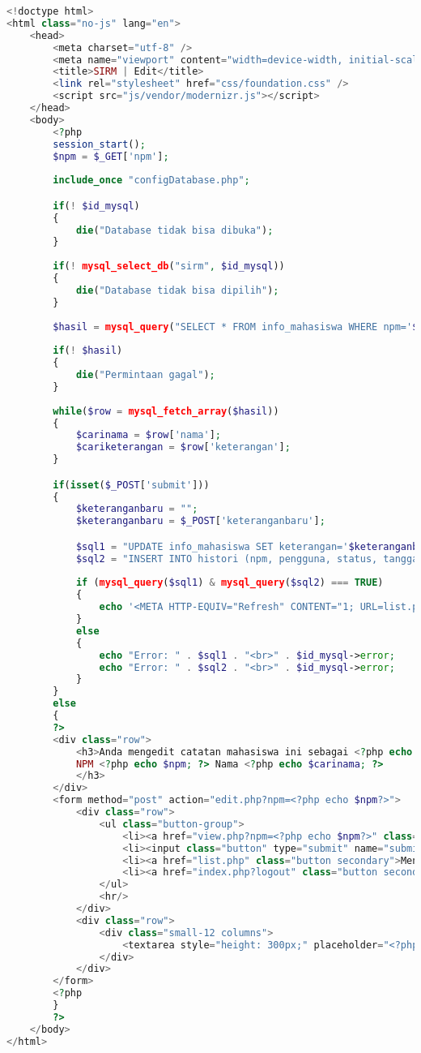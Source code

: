 \begin{lstlisting}[language=php,basicstyle=\tiny,caption=edit.php]
<!doctype html>
<html class="no-js" lang="en">
	<head>
		<meta charset="utf-8" />
		<meta name="viewport" content="width=device-width, initial-scale=1.0" />
		<title>SIRM | Edit</title>
		<link rel="stylesheet" href="css/foundation.css" />
		<script src="js/vendor/modernizr.js"></script>
	</head>
	<body>
		<?php
		session_start();
		$npm = $_GET['npm'];
		
		include_once "configDatabase.php";

		if(! $id_mysql)
		{
			die("Database tidak bisa dibuka");
		}
			
		if(! mysql_select_db("sirm", $id_mysql))
		{
			die("Database tidak bisa dipilih");
		}
			
		$hasil = mysql_query("SELECT * FROM info_mahasiswa WHERE npm='$npm'", $id_mysql);
		
		if(! $hasil)
		{
			die("Permintaan gagal");
		}
		
		while($row = mysql_fetch_array($hasil))
		{
			$carinama = $row['nama'];
			$cariketerangan = $row['keterangan'];
		}

		if(isset($_POST['submit']))
		{
			$keteranganbaru = "";
			$keteranganbaru = $_POST['keteranganbaru'];

			$sql1 = "UPDATE info_mahasiswa SET keterangan='$keteranganbaru', pembaruan_terakhir=now() WHERE npm='$npm'";
			$sql2 = "INSERT INTO histori (npm, pengguna, status, tanggal_pembaruan, keterangan) VALUES ('". mysql_real_escape_string($npm)  ."', '".$_SESSION['email']."', 'mengedit', now(), '". mysql_real_escape_string($keteranganbaru)  ."')";
			
			if (mysql_query($sql1) & mysql_query($sql2) === TRUE) 
			{
				echo '<META HTTP-EQUIV="Refresh" CONTENT="1; URL=list.php">';
			} 
			else
			{
				echo "Error: " . $sql1 . "<br>" . $id_mysql->error;
				echo "Error: " . $sql2 . "<br>" . $id_mysql->error;
			}
		}
		else
		{
		?>
		<div class="row">
			<h3>Anda mengedit catatan mahasiswa ini sebagai <?php echo $_SESSION['email']?>.<br/>
			NPM <?php echo $npm; ?> Nama <?php echo $carinama; ?>
			</h3>
		</div>
		<form method="post" action="edit.php?npm=<?php echo $npm?>">
			<div class="row">
				<ul class="button-group">
					<li><a href="view.php?npm=<?php echo $npm?>" class="button secondary">Kembali</a></li>
					<li><input class="button" type="submit" name="submit" value="Simpan"></li>
					<li><a href="list.php" class="button secondary">Menu Utama</a></li>
					<li><a href="index.php?logout" class="button secondary">Logout</a></li>
				</ul>
				<hr/>
			</div>
			<div class="row">
				<div class="small-12 columns">
					<textarea style="height: 300px;" placeholder="<?php echo $cariketerangan; ?>" name="keteranganbaru"><?php echo $cariketerangan; ?></textarea>
				</div>
			</div>
		</form>
		<?php
		}
		?>
	</body>
</html>
\end{lstlisting}

